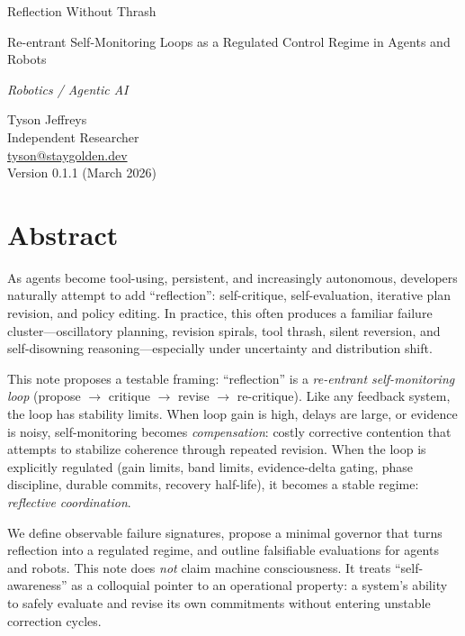 \documentclass[11pt]{article}
\begin{document}
\begin{titlepage}
\thispagestyle{empty}
\raggedright

\vspace*{0.62\textheight}

{\LARGE Reflection Without Thrash\par}
\vspace{0.2cm}
{\Large Re-entrant Self-Monitoring Loops as a Regulated Control Regime in Agents and Robots\par}
\vspace{0.6em}
{\large\itshape Robotics / Agentic AI\par}

\vspace{1.6em}

Tyson Jeffreys\\
Independent Researcher\\
\href{mailto:tyson@staygolden.dev}{tyson@staygolden.dev}\\
Version 0.1.1 \quad (March 2026)

\vfill
\end{titlepage}

\section*{Abstract}
As agents become tool-using, persistent, and increasingly autonomous, developers naturally attempt to add
\enquote{reflection}: self-critique, self-evaluation, iterative plan revision, and policy editing. In practice, this
often produces a familiar failure cluster—oscillatory planning, revision spirals, tool thrash, silent reversion,
and self-disowning reasoning—especially under uncertainty and distribution shift.

This note proposes a testable framing: \enquote{reflection} is a \emph{re-entrant self-monitoring loop}
(propose $\rightarrow$ critique $\rightarrow$ revise $\rightarrow$ re-critique). Like any feedback system, the loop has stability
limits. When loop gain is high, delays are large, or evidence is noisy, self-monitoring becomes
\emph{compensation}: costly corrective contention that attempts to stabilize coherence through repeated revision.
When the loop is explicitly regulated (gain limits, band limits, evidence-delta gating, phase discipline,
durable commits, recovery half-life), it becomes a stable regime: \emph{reflective coordination}.

We define observable failure signatures, propose a minimal governor that turns reflection into a regulated
regime, and outline falsifiable evaluations for agents and robots. This note does \emph{not} claim machine
consciousness. It treats \enquote{self-awareness} as a colloquial pointer to an operational property: a system’s
ability to safely evaluate and revise its own commitments without entering unstable correction cycles.
\end{document}

